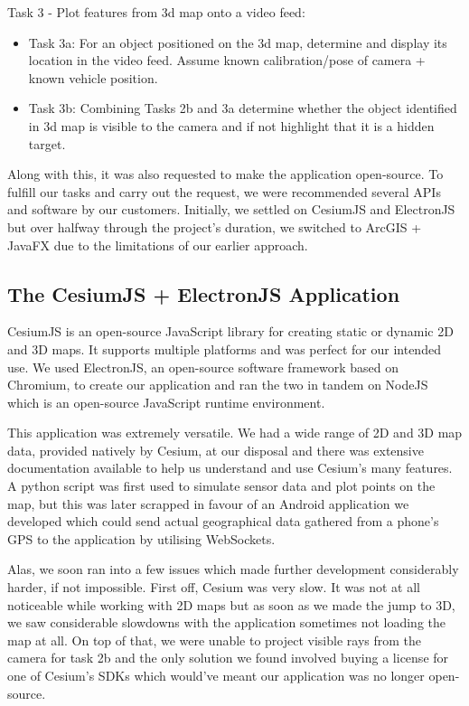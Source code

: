 \documentclass{l3proj}
\begin{document}
Task 3 - Plot features from 3d map onto a video feed:
\begin{itemize}
	\item Task 3a: For an object positioned on the 3d map, determine and display its location in the video feed. Assume known calibration/pose of camera + known vehicle position. 
	\item Task 3b: Combining Tasks 2b and 3a determine whether the object identified in 3d map is visible to the camera and if not highlight that it is a hidden target.   
\end{itemize}

Along with this, it was also requested to make the application open-source. To fulfill our tasks and carry out the request, we were recommended several APIs and software by our customers. Initially, we settled on CesiumJS and ElectronJS but over halfway through the project’s duration, we switched to ArcGIS + JavaFX due to the limitations of our earlier approach.

\subsection{The CesiumJS + ElectronJS Application}

CesiumJS is an open-source JavaScript library for creating static or dynamic 2D and 3D maps. It supports multiple platforms and was perfect for our intended use. We used ElectronJS, an open-source software framework based on Chromium, to create our application and ran the two in tandem on NodeJS which is an open-source JavaScript runtime environment.

This application was extremely versatile. We had a wide range of 2D and 3D map data, provided natively by Cesium, at our disposal and there was extensive documentation available to help us understand and use Cesium’s many features. A python script was first used to simulate sensor data and plot points on the map, but this was later scrapped in favour of an Android application we developed which could send actual geographical data gathered from a phone’s GPS to the application by utilising WebSockets.

Alas, we soon ran into a few issues which made further development considerably harder, if not impossible. First off, Cesium was very slow. It was not at all noticeable while working with 2D maps but as soon as we made the jump to 3D, we saw considerable slowdowns with the application sometimes not loading the map at all. On top of that, we were unable to project visible rays from the camera for task 2b and the only solution we found involved buying a license for one of Cesium’s SDKs which would’ve meant our application was no longer open-source.
\end{document}
